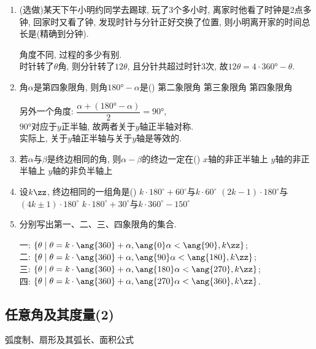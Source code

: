 \begin{enumerate}
\item (选做)某天下午小明约同学去踢球, 玩了3个多小时, 离家时他看了时钟是2点多钟, 回家时又看了钟, 发现时针与分针正好交换了位置, 
则小明离开家的时间总长是(精确到分钟). 
\begin{jieda}
角度不同, 过程的多少有别. \\
时针转了$\theta$角, 则分针转了$12\theta$, 且分针共超过时针3次, 
故$12\theta=4\cdot\ang{360}-\theta$. 
\end{jieda}

\item 角$\alpha$是第四象限角, 则角$\ang{180}-\alpha$是\dotfill()
{第二象限角}
{第三象限角}
{第四象限角}
\begin{jieda}
另外一个角度: $\dfrac{\alpha+(\ang{180}-\alpha)}{2}=\ang{90}$, \\
$\ang{90}$对应于$y$正半轴, 故两者关于$y$轴正半轴对称. \\
实际上, 关于$y$轴正半轴与关于$y$轴是等效的. 
\end{jieda}


\item 若$\alpha$与$\beta$是终边相同的角, 则$\alpha-\beta$的终边一定在\dotfill()
{$x$轴的非正半轴上}
{$y$轴的非正半轴上}
{$y$轴的非负半轴上}



\item 设$k\zz$, 终边相同的一组角是\dotfill()
{$k\cdot 180^{\circ}+60^{\circ}$与$k\cdot 60^{\circ}$}
{$(2k-1)\cdot 180^{\circ}$与$(4k\pm 1)\cdot 180^{\circ}$}
{$k\cdot 180^{\circ}+30^{\circ}$与$k\cdot 360^{\circ}-150^{\circ}$}



\item 分别写出第一、二、三、四象限角的集合. 
\begin{jieda}
一: $\{\theta\mid\theta=k\cdot\ang{360}+\alpha,\ang{0}\alpha<\ang{90},k\zz\}$; \\
二: $\{\theta\mid\theta=k\cdot\ang{360}+\alpha,\ang{90}\alpha<\ang{180},k\zz\}$; \\
三: $\{\theta\mid\theta=k\cdot\ang{360}+\alpha,\ang{180}\alpha<\ang{270},k\zz\}$; \\
四: $\{\theta\mid\theta=k\cdot\ang{360}+\alpha,\ang{270}\alpha<\ang{360},k\zz\}$. 
\end{jieda}
\end{enumerate}




\subsection{任意角及其度量(2)}
\zsd 弧度制、扇形及其弧长、面积公式

